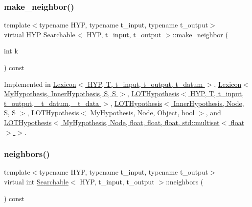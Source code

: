 \mbox{\label{class_searchable_a64bda92cc9314dae7aff31f4444a93e6}} 
\subsubsection{\texorpdfstring{make\+\_\+neighbor()}{make\_neighbor()}}
{\footnotesize\ttfamily template$<$typename H\+YP, typename t\+\_\+input, typename t\+\_\+output$>$ \\
virtual H\+YP \hyperlink{class_searchable}{Searchable}$<$ H\+YP, t\+\_\+input, t\+\_\+output $>$\+::make\+\_\+neighbor (\begin{DoxyParamCaption}\item[{int}]{k }\end{DoxyParamCaption}) const\hspace{0.3cm}{\ttfamily [pure virtual]}}



Implemented in \hyperlink{class_lexicon_a3d4fb7e4545267221eb38acba4d52a6b}{Lexicon$<$ H\+Y\+P, T, t\+\_\+input, t\+\_\+output, t\+\_\+datum $>$}, \hyperlink{class_lexicon_a3d4fb7e4545267221eb38acba4d52a6b}{Lexicon$<$ My\+Hypothesis, Inner\+Hypothesis, S, S $>$}, \hyperlink{class_l_o_t_hypothesis_ae7771176b8b2599f42c75318ee0e9164}{L\+O\+T\+Hypothesis$<$ H\+Y\+P, T, t\+\_\+input, t\+\_\+output, \+\_\+t\+\_\+datum, \+\_\+t\+\_\+data $>$}, \hyperlink{class_l_o_t_hypothesis_ae7771176b8b2599f42c75318ee0e9164}{L\+O\+T\+Hypothesis$<$ Inner\+Hypothesis, Node, S, S $>$}, \hyperlink{class_l_o_t_hypothesis_ae7771176b8b2599f42c75318ee0e9164}{L\+O\+T\+Hypothesis$<$ My\+Hypothesis, Node, Object, bool $>$}, and \hyperlink{class_l_o_t_hypothesis_ae7771176b8b2599f42c75318ee0e9164}{L\+O\+T\+Hypothesis$<$ My\+Hypothesis, Node, float, float, float, std\+::multiset$<$ float $>$ $>$}.

\mbox{\label{class_searchable_a0450c35a21c5940a63560aa24b4ff0cc}} 
\subsubsection{\texorpdfstring{neighbors()}{neighbors()}}
{\footnotesize\ttfamily template$<$typename H\+YP, typename t\+\_\+input, typename t\+\_\+output$>$ \\
virtual int \hyperlink{class_searchable}{Searchable}$<$ H\+YP, t\+\_\+input, t\+\_\+output $>$\+::neighbors (\begin{DoxyParamCaption}{ }\end{DoxyParamCaption}) const\hspace{0.3cm}{\ttfamily [pure virtual]}}



